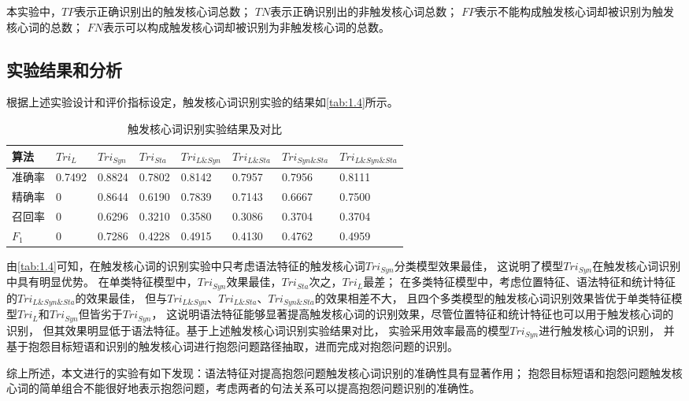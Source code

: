 本实验中，$TP$表示正确识别出的触发核心词总数；
$TN$表示正确识别出的非触发核心词总数；
$FP$表示不能构成触发核心词却被识别为触发核心词的总数；
$FN$表示可以构成触发核心词却被识别为非触发核心词的总数。


\subsection{实验结果和分析}\label{subsection:1.4.3}
根据上述实验设计和评价指标设定，触发核心词识别实验的结果如\autoref{tab:1.4}所示。
\begin{table}[ht]
    \centering
    \caption{触发核心词识别实验结果及对比}\label{tab:1.4}
    \vskip -10pt
    \begin{tabularx}{\textwidth}{lYYYYYYY}
    \toprule
    算法 & $Tri_L$ & $Tri_{Syn}$ & $Tri_{Sta}$ & $Tri_{L\&Syn}$ & $Tri_{L\&Sta}$ & $Tri_{Syn\&Sta}$ & $Tri_{L\&Syn\&Sta}$ \\
    \midrule
    准确率 & 0.7492 & 0.8824 & 0.7802 & 0.8142 & 0.7957 & 0.7956 & 0.8111 \\
    精确率 & 0 & 0.8644 & 0.6190 & 0.7839 & 0.7143 & 0.6667 & 0.7500 \\
    召回率 & 0 & 0.6296 & 0.3210 & 0.3580 & 0.3086 & 0.3704 & 0.3704 \\
    $F_1$ & 0 & 0.7286 & 0.4228 & 0.4915 & 0.4130 & 0.4762 & 0.4959 \\
    \bottomrule
    \end{tabularx}
\end{table}

由\autoref{tab:1.4}可知，在触发核心词的识别实验中只考虑语法特征的触发核心词$Tri_{Syn}$分类模型效果最佳，
这说明了模型$Tri_{Syn}$在触发核心词识别中具有明显优势。
在单类特征模型中，$Tri_{Syn}$效果最佳，$Tri_{Sta}$次之，$Tri_L$最差；
在多类特征模型中，考虑位置特征、语法特征和统计特征的$Tri_{L\&Syn\&Sta}$的效果最佳，
但与$Tri_{L\&Syn}$、$Tri_{L\&Sta}$、$Tri_{Syn\&Sta}$的效果相差不大，
且四个多类模型的触发核心词识别效果皆优于单类特征模型$Tri_L$和$Tri_{Syn}$但皆劣于$Tri_{Syn}$，
这说明语法特征能够显著提高触发核心词的识别效果，尽管位置特征和统计特征也可以用于触发核心词的识别，
但其效果明显低于语法特征。基于上述触发核心词识别实验结果对比，
实验采用效率最高的模型$Tri_{Syn}$进行触发核心词的识别，
并基于抱怨目标短语和识别的触发核心词进行抱怨问题路径抽取，进而完成对抱怨问题的识别。

综上所述，本文进行的实验有如下发现：语法特征对提高抱怨问题触发核心词识别的准确性具有显著作用；
抱怨目标短语和抱怨问题触发核心词的简单组合不能很好地表示抱怨问题，考虑两者的句法关系可以提高抱怨问题识别的准确性。